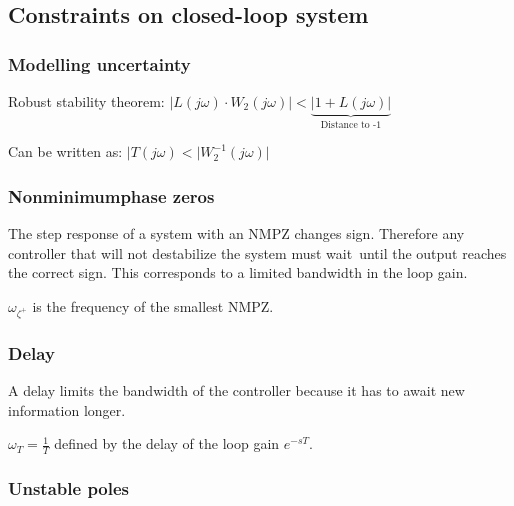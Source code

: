 \documentclass[10pt,a4paper]{scrartcl}
\begin{document}
\begin{multicols*}{3}
	
	
	\subsection{Constraints on closed-loop system}
	
	\subsubsection{Modelling uncertainty}
	
	
	Robust stability theorem: $|L(j\omega)\cdot W_2(j\omega)|<\underbrace{|1+L(j\omega)|}_{\text{Distance to -1}}$
	
	Can be written as: $|T(j\omega)<|W_2^{-1}(j\omega)|$
	
	
	
	
	
	\subsubsection{Nonminimumphase zeros}
	
	The step response of a system with an NMPZ changes sign. Therefore any controller that will not destabilize the system must \glqq wait\grqq\ until the output reaches the correct sign. This corresponds to a limited bandwidth in the loop gain.
	
	
	$\omega_{\zeta^+}$ is the frequency of the smallest NMPZ.
	
	
	
	\subsubsection{Delay}
	
	A delay limits the bandwidth of the controller because it has to await new information longer.
	
	
	$\omega_T=\frac{1}{T}$ defined by the delay of the loop gain $e^{-sT}$.
	
	
	
	\subsubsection{Unstable poles}
	

\end{multicols*}
\end{document}
